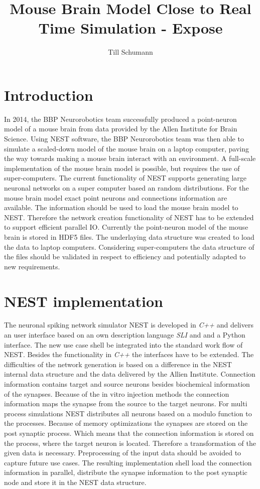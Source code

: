 \documentclass[a4paper]{article}
\title{Mouse Brain Model Close to Real Time Simulation - Expose}
\author{Till Schumann}
\begin{document}
   \maketitle


\section{Introduction}
In 2014, the BBP Neurorobotics team successfully produced a point-neuron model
of a mouse brain from data provided by the Allen Institute for Brain Science.
Using NEST software, the BBP Neurorobotics team was then able to simulate a
scaled-down model of the mouse brain on a laptop computer, paving the way towards
making a mouse brain interact with an environment. A full-scale implementation of
the mouse brain model is possible, but requires the use of super-computers.
The current functionality of NEST supports  generating large neuronal networks
on a super computer based an random distributions. For the mouse brain model
exact point neurons and connections information are available. The information should
be used to load the mouse brain model to NEST. Therefore the network creation
functionality of NEST has to be extended to support efficient parallel IO.
Currently the point-neuron model of the mouse brain is stored in HDF5 files.
The underlaying data structure was created to load the data to laptop computers.
Considering super-computers the data structure of the files should be
validated in respect to efficiency and potentially adapted to new requirements.


\section{NEST implementation}

The neuronal spiking network simulator NEST is developed in \emph{C++} and delivers
an user interface based on an own description language \emph{SLI} and  and a Python interface.
The new use case shell be integrated into the standard work flow of NEST.
Besides the functionality in \emph{C++} the interfaces have to be extended.
The difficulties of the network generation is based on a difference in 
the NEST internal data structure and the data delivered by the Allien Institute.
Connection information contains target and source neurons besides biochemical
information of the synapses. Because of the in vitro injection methods the
connection information maps the synapse from the source to the target neurons.
For multi process simulations NEST distributes all neurons based on a modulo function 
to the processes. Because of memory optimizations the synapses are stored on the
post synaptic process. Which means that the connection information is stored
on the process, where the target neuron is located. Therefore a transformation of the given data is
necessary. Preprocessing of the input data should be avoided to capture future use cases.
The resulting implementation shell load the connection information in parallel,
distribute the synapse information to the post synaptic node and store it in
the NEST data structure.
\end{document}
